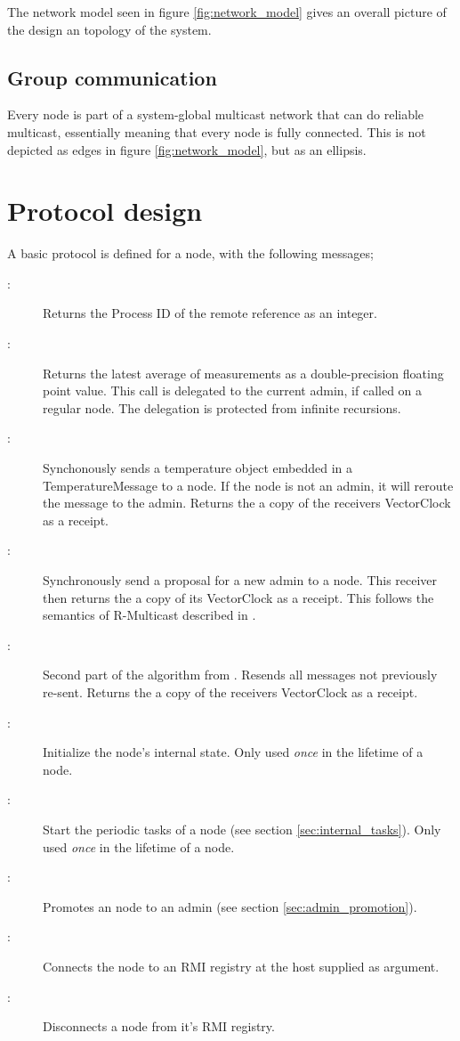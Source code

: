 \documentclass[10pt,a4paper]{article}
\begin{document}
The network model seen in figure \ref{fig:network_model} gives an overall picture of the design an topology of the system.

\subsection{Group communication}
Every node is part of a system-global multicast network that can do reliable multicast, essentially meaning that every node is fully connected. This is not depicted as edges in figure \ref{fig:network_model}, but as an ellipsis.
\section{Protocol design}
\label{sec:protocol_design}
A basic protocol is defined for a node, with the following messages;
\begin{description}
  \item[:] Returns the Process ID of the remote reference as an integer.
  \item[:] Returns the latest average of measurements as a double-precision floating point value. This call is delegated to the current admin, if called on a regular node. The delegation is protected from infinite recursions.
  \item[:] Synchonously sends a temperature object embedded in a TemperatureMessage to a node. If the node is not an admin, it will reroute the message to the admin. Returns the a copy of the receivers VectorClock as a receipt.
  \item[:] Synchronously send a proposal for a new admin to a node. This receiver then returns the a copy of its VectorClock as a receipt. This follows the semantics of R-Multicast described in \cite{DistSystems}.
  \item[:] Second part of the algorithm from . Resends all messages not previously re-sent. Returns the a copy of the receivers VectorClock as a receipt.
  \item[:] Initialize the node's internal state. Only used \emph{once} in the lifetime of a node.
  \item[:] Start the periodic tasks of a node (see section \ref{sec:internal_tasks}). Only used \emph{once} in the lifetime of a node.
  \item[:] Promotes an node to an admin (see section \ref{sec:admin_promotion}).
  \item[:] Connects the node to an RMI registry at the host supplied as argument.
  \item[:] Disconnects a node from it's RMI registry.
\end{description} 
\end{document}
